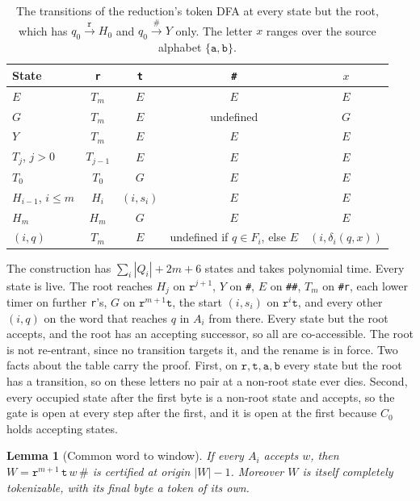 \documentclass[11pt,a4paper]{article}
\theoremstyle{definition}
\theoremstyle{plain}
\newtheorem{lemma}{Lemma}
\newcommand{\code}[1]{\texttt{#1}}
\begin{document}
\begin{table}[!htbp]
\centering
\caption{The transitions of the reduction's token DFA at every state but the root, which has
$q_0 \xrightarrow{\code{r}} H_0$ and $q_0 \xrightarrow{\code{\#}} Y$ only. The letter $x$ ranges over the source
alphabet $\{\code{a}, \code{b}\}$.}
\label{tab:reduction}
\begin{tabular}{lcccc}
\toprule
State & \code{r} & \code{t} & \code{\#} & $x$ \\
\midrule
$E$ & $T_m$ & $E$ & $E$ & $E$ \\
$G$ & $T_m$ & $E$ & undefined & $G$ \\
$Y$ & $T_m$ & $E$ & $E$ & $E$ \\
$T_j$, $j > 0$ & $T_{j-1}$ & $E$ & $E$ & $E$ \\
$T_0$ & $T_0$ & $G$ & $E$ & $E$ \\
$H_{i-1}$, $i \leq m$ & $H_i$ & $(i, s_i)$ & $E$ & $E$ \\
$H_m$ & $H_m$ & $G$ & $E$ & $E$ \\
$(i, q)$ & $T_m$ & $E$ & undefined if $q \in F_i$, else $E$ & $(i, \delta_i(q, x))$ \\
\bottomrule
\end{tabular}
\end{table}

The construction has $\sum_i |Q_i| + 2m + 6$ states and takes polynomial time. Every state is live. The root reaches
$H_j$ on $\code{r}^{j+1}$, $Y$ on \code{\#}, $E$ on \code{\#\#}, $T_m$ on \code{\#r}, each lower timer on further
\code{r}'s, $G$ on $\code{r}^{m+1}\code{t}$, the start $(i, s_i)$ on $\code{r}^{i}\code{t}$, and every other $(i, q)$ on
the word that reaches $q$ in $A_i$ from there. Every state but the root accepts, and the root has an accepting
successor, so all are co-accessible. The root is not re-entrant, since no transition targets it, and the rename is in
force. Two facts about the table carry the proof. First, on $\code{r}, \code{t}, \code{a}, \code{b}$ every state but the
root has a transition, so on these letters no pair at a non-root state ever dies. Second, every occupied state after the
first byte is a non-root state and accepts, so the gate is open at every step after the first, and it is open at the
first because $C_0$ holds accepting states.

\begin{lemma}[Common word to window]
\label{lem:reduction-forward}
If every $A_i$ accepts $w$, then $W = \code{r}^{m+1}\, \code{t}\, w\, \code{\#}$ is certified at origin $|W| - 1$.
Moreover $W$ is itself completely tokenizable, with its final byte a token of its own.
\end{lemma}
\end{document}

